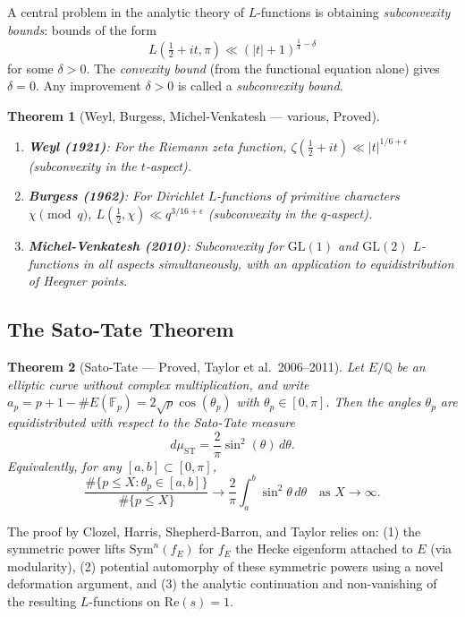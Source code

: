 \documentclass[12pt,a4paper]{amsart}
\newtheorem{theorem}{Theorem}[section]
\theoremstyle{definition}
\newcommand{\QQ}{\mathbb{Q}}
\newcommand{\FF}{\mathbb{F}}
\newcommand{\GL}{\mathrm{GL}}
\newcommand{\re}{\mathrm{Re}}
\begin{document}
A central problem in the analytic theory of $L$-functions is obtaining
\emph{subconvexity bounds}: bounds of the form
\[
L(\tfrac{1}{2} + it, \pi) \ll (|t| + 1)^{\frac{1}{4} - \delta}
\]
for some $\delta > 0$. The \emph{convexity bound} (from the functional equation alone)
gives $\delta = 0$. Any improvement $\delta > 0$ is called a \emph{subconvexity bound}.

\begin{theorem}[Weyl, Burgess, Michel-Venkatesh — various, Proved]
\begin{enumerate}[label=(\roman*)]
\item \textbf{Weyl (1921)}: For the Riemann zeta function,
  $\zeta(\frac{1}{2}+it) \ll |t|^{1/6+\epsilon}$ (subconvexity in the $t$-aspect).
\item \textbf{Burgess (1962)}: For Dirichlet $L$-functions of primitive characters $\chi \pmod{q}$,
  $L(\frac{1}{2}, \chi) \ll q^{3/16+\epsilon}$ (subconvexity in the $q$-aspect).
\item \textbf{Michel-Venkatesh (2010)}: Subconvexity for $\GL(1)$ and $\GL(2)$
  $L$-functions in all aspects simultaneously, with an application to equidistribution
  of Heegner points.
\end{enumerate}
\end{theorem}

\subsection{The Sato-Tate Theorem}

\begin{theorem}[Sato-Tate — Proved, Taylor et al.\ 2006--2011]
\label{thm:sato_tate}
Let $E/\QQ$ be an elliptic curve without complex multiplication, and write
$a_p = p + 1 - \#E(\FF_p) = 2\sqrt{p}\cos(\theta_p)$ with $\theta_p \in [0,\pi]$.
Then the angles $\theta_p$ are equidistributed with respect to the Sato-Tate measure
\[
d\mu_{\mathrm{ST}} = \frac{2}{\pi}\sin^2(\theta)\, d\theta.
\]
Equivalently, for any $[a,b] \subset [0,\pi]$,
\[
\frac{\#\{p \leq X : \theta_p \in [a,b]\}}{\#\{p \leq X\}} \longrightarrow \frac{2}{\pi} \int_a^b \sin^2\theta\, d\theta
\quad \text{as } X \to \infty.
\]
\end{theorem}

The proof by Clozel, Harris, Shepherd-Barron, and Taylor relies on:
(1) the symmetric power lifts $\mathrm{Sym}^n(f_E)$ for $f_E$ the Hecke eigenform
attached to $E$ (via modularity), (2) potential automorphy of these symmetric powers
using a novel deformation argument, and (3) the analytic continuation and non-vanishing
of the resulting $L$-functions on $\re(s) = 1$.
\end{document}

